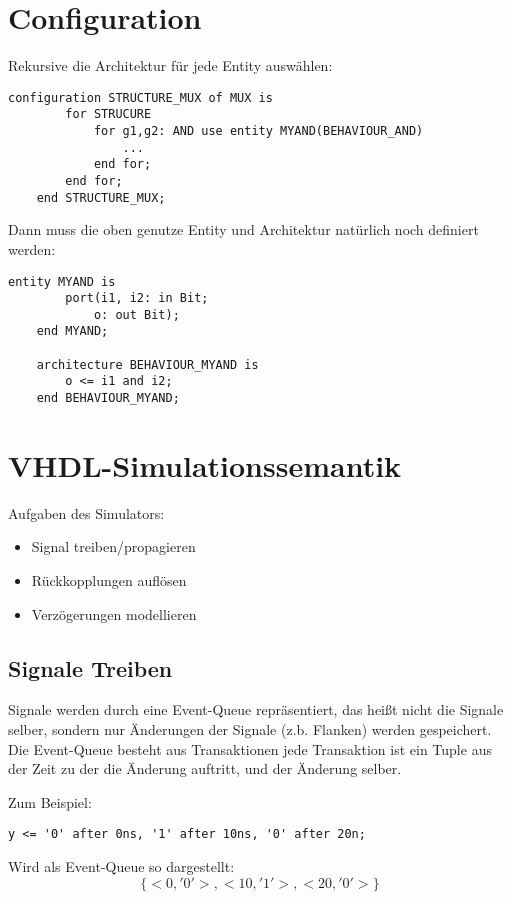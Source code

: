 \section{Configuration}
Rekursive die Architektur für jede Entity auswählen:
\begin{lstlisting}[style=vhdl]
    configuration STRUCTURE_MUX of MUX is
        for STRUCURE
            for g1,g2: AND use entity MYAND(BEHAVIOUR_AND)
                ...
            end for;
        end for;
    end STRUCTURE_MUX;
\end{lstlisting}

Dann muss die oben genutze Entity und Architektur natürlich noch definiert werden:
\begin{lstlisting}[style=vhdl]
    entity MYAND is
        port(i1, i2: in Bit; 
            o: out Bit);
    end MYAND;

    architecture BEHAVIOUR_MYAND is
        o <= i1 and i2;
    end BEHAVIOUR_MYAND;
\end{lstlisting}

\section{VHDL-Simulationssemantik}
Aufgaben des Simulators:
\begin{itemize}
    \item Signal treiben/propagieren
    \item Rückkopplungen auflösen
    \item Verzögerungen modellieren
\end{itemize}

\subsection{Signale Treiben}
Signale werden durch eine Event-Queue repräsentiert, das heißt nicht die Signale selber, sondern nur Änderungen der Signale (z.b. Flanken) werden gespeichert.
Die Event-Queue besteht aus \glqq{}Transaktionen\grqq{} jede Transaktion ist ein Tuple aus der Zeit zu der die Änderung auftritt, und der Änderung selber.

Zum Beispiel:
\begin{lstlisting}[style=vhdl]
    y <= '0' after 0ns, '1' after 10ns, '0' after 20n;
\end{lstlisting}
Wird als Event-Queue so dargestellt:
\begin{equation*}
    \{<0,'0'>, <10, '1'>, <20, '0'>\}
\end{equation*}

